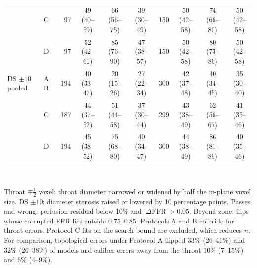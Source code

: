 \documentclass[journal,twoside,web,onecolumn]{ieeecolor}
\begin{document}
\begin{table}[!ht]
\begin{tabular}{@{}llrccc rccc@{}}
 & C & 97 & 49 (40--59) & 66 (56--75) & 39 (30--49) & 150 & 50 (42--58) & 74 (66--80) & 50 (42--58) \\
 & D & 97 & 52 (42--61) & 85 (76--90) & 47 (38--57) & 150 & 50 (42--58) & 80 (73--86) & 50 (42--58) \\
\addlinespace[2pt]
DS $\pm10$ pooled & A, B & 194 & 40 (33--47) & 20 (15--26) & 27 (22--34) & 300 & 42 (37--48) & 40 (34--45) & 35 (30--40) \\
 & C & 187 & 44 (37--52) & 51 (44--58) & 37 (30--44) & 299 & 43 (38--49) & 62 (56--67) & 41 (35--46) \\
 & D & 194 & 45 (38--52) & 75 (68--80) & 40 (34--47) & 300 & 44 (38--49) & 86 (81--89) & 40 (35--46) \\
\bottomrule
\end{tabular}
\\[3pt]
\parbox{0.95\textwidth}{\footnotesize Throat $\mp\tfrac12$ voxel: throat diameter narrowed or widened by half the in-plane voxel size. DS $\pm10$: diameter stenosis raised or lowered by 10 percentage points. Passes and wrong: perfusion residual below 10\% and $|\Delta\mathrm{FFR}| > 0.05$. Beyond zone: flips whose corrupted FFR lies outside 0.75--0.85. Protocols A and B coincide for throat errors. Protocol C fits on the search bound are excluded, which reduces $n$. For comparison, topological errors under Protocol A flipped 33\% (26--41\%) and 32\% (26--38\%) of models and caliber errors away from the throat 10\% (7--15\%) and 6\% (4--9\%).}
\end{table}

\FloatBarrier
\end{document}
